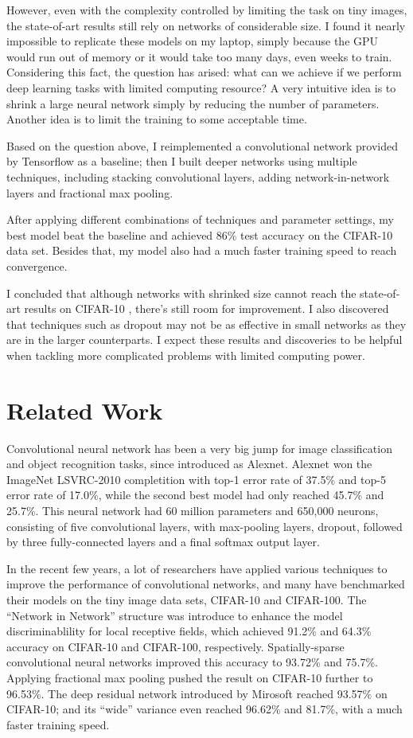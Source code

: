 \documentclass[conference]{IEEEtran}
\begin{document}
However, even with the complexity controlled by limiting the task on tiny images, the state-of-art results still rely on networks of considerable size\cite{frac}. I found it nearly impossible to replicate these models on my laptop, simply because the GPU would run out of memory or it would take too many days, even weeks to train. Considering this fact, the question has arised: what can we achieve if we perform deep learning tasks with limited computing resource? A very intuitive idea is to shrink a large neural network simply by reducing the number of parameters. Another idea is to limit the training to some acceptable time. 

Based on the question above, I reimplemented a convolutional network provided by Tensorflow\cite{tut} as a baseline; then I built deeper networks using multiple techniques, including stacking convolutional layers, adding network-in-network layers and fractional max pooling.

After applying different combinations of techniques and parameter settings, my best model beat the baseline and achieved 86\% test accuracy on the CIFAR-10 data set. Besides that, my model also had a much faster training speed to reach convergence.

I concluded that although networks with shrinked size cannot reach the state-of-art results on CIFAR-10 \cite{leaderboard}, there's still room for improvement. I also discovered that techniques such as dropout may not be as effective in small networks as they are in the larger counterparts. I expect these results and discoveries to be helpful when tackling more complicated problems with limited computing power.

\section{Related Work}
Convolutional neural network has been a very big jump for image classification and object recognition tasks, since introduced as Alexnet\cite{conv}. Alexnet won the ImageNet LSVRC-2010 completition with top-1 error rate of 37.5\% and top-5 error rate of 17.0\%, while the second best model had only reached 45.7\% and 25.7\%\cite{conv}. This neural network had 60 million parameters and 650,000 neurons, consisting of five convolutional layers, with max-pooling layers, dropout, followed by three fully-connected layers and a final softmax output layer\cite{conv}.

In the recent few years, a lot of researchers have applied various techniques to improve the performance of convolutional networks, and many have benchmarked their models on the tiny image data sets, CIFAR-10 and CIFAR-100. The ``Network in Network'' structure was introduce to enhance the model discriminablility for local receptive fields, which achieved 91.2\% and 64.3\% accuracy on CIFAR-10 and CIFAR-100, respectively\cite{nin}. Spatially-sparse convolutional neural networks improved this accuracy to 93.72\% and 75.7\%\cite{sparse}. Applying fractional max pooling pushed the result on CIFAR-10 further to 96.53\%\cite{fmp}. The deep residual network introduced by Mirosoft reached 93.57\% on CIFAR-10\cite{res}; and its ``wide'' variance even reached 96.62\% and 81.7\%, with a much faster training speed\cite{wide}.
\end{document}
